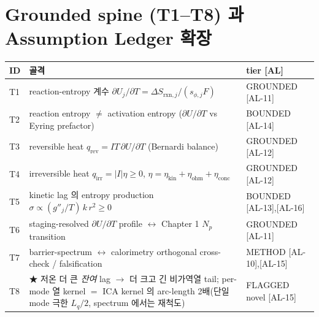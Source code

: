 \documentclass[11pt,a4paper]{article}
\newcommand{\rxn}{\mathrm{rxn}}
\newcommand{\rev}{\mathrm{rev}}
\newcommand{\irr}{\mathrm{irr}}
\newcommand{\kin}{\mathrm{kin}}
\newcommand{\ohm}{\mathrm{ohm}}
\newcommand{\conc}{\mathrm{conc}}
\newcommand{\AL}[1]{\textsf{[AL-#1]}}
\begin{document}
\section{Grounded spine (T1--T8) 과 Assumption Ledger 확장}\label{sec:spine}
\begin{longtable}{p{} p{} p{}}
\toprule ID & 골격 & tier [AL] \\ \midrule \endhead
T1 & reaction-entropy 계수 $\partial U_j/\partial T=\Delta S_{\rxn,j}/(s_{\phi,j}F)$ & GROUNDED \AL{11} \\
T2 & reaction entropy $\ne$ activation entropy ($\partial U/\partial T$ vs Eyring prefactor) & BOUNDED \AL{14} \\
T3 & reversible heat $q_\rev=IT\,\partial U/\partial T$ (Bernardi balance) & GROUNDED \AL{12} \\
T4 & irreversible heat $q_\irr=|I|\eta\ge0$, $\eta=\eta_\kin+\eta_\ohm+\eta_\conc$ & GROUNDED \AL{12} \\
T5 & kinetic lag 의 entropy production $\sigma\propto (g''_j/T)\,k\,r^2\ge0$ & BOUNDED \AL{13},\AL{16} \\
T6 & staging-resolved $\partial U/\partial T$ profile $\leftrightarrow$ Chapter 1 $N_p$ transition & GROUNDED \AL{11} \\
T7 & barrier-spectrum $\leftrightarrow$ calorimetry orthogonal cross-check / falsification & METHOD \AL{10},\AL{15} \\
T8 & ★ 저온 더 큰 \emph{잔여} lag $\to$ 더 크고 긴 비가역열 tail; per-mode 열 kernel $=$ ICA kernel 의 arc-length 2배(단일 mode 극한 $L_q/2$, spectrum 에서는 재척도) & FLAGGED novel \AL{15} \\
\bottomrule
\end{longtable}
\end{document}
